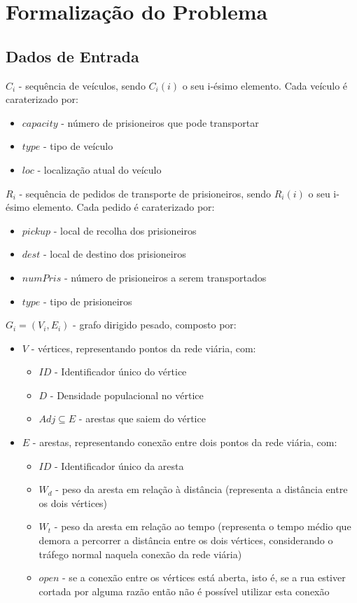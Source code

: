 \documentclass[article, a4paper, 12pt, oneside]{memoir}
\begin{document}
\chapter[Formalização do Problema][Formalização do Problema]{Formalização do Problema} \label{\thechapter}

\section{Dados de Entrada}

$C_i$ - sequência de veículos, sendo $C_i(i)$ o seu i-ésimo elemento. Cada veículo é caraterizado por:
\begin{itemize}
	\item $capacity$ - número de prisioneiros que pode transportar
	\item $type$ - tipo de veículo
	\item $loc$ - localização atual do veículo
\end{itemize}

$R_i$ - sequência de pedidos de transporte de prisioneiros, sendo $R_i(i)$ o seu i-ésimo elemento. Cada pedido é caraterizado por:
\begin{itemize}
	\item $pickup$ - local de recolha dos prisioneiros
	\item $dest$ - local de destino dos prisioneiros
	\item $numPris$ - número de prisioneiros a serem transportados
	\item $type$ - tipo de prisioneiros
\end{itemize}

$G_i = (V_i, E_i)$ - grafo dirigido pesado, composto por:
\begin{itemize}
	\item $V$ - vértices, representando pontos da rede viária, com:
		\begin{itemize}
			\item $ID$ - Identificador único do vértice
			\item $D$ - Densidade populacional no vértice
			\item $Adj \subseteq E$ - arestas que saiem do vértice
		\end{itemize}
	\item $E$ - arestas, representando conexão entre dois pontos da rede viária, com:
		\begin{itemize}
			\item $ID$ - Identificador único da aresta
			\item $W_d$ - peso da aresta em relação à distância (representa a distância entre os dois vértices)
			\item $W_t$ - peso da aresta em relação ao tempo (representa o tempo médio que demora a percorrer a distância entre os dois vértices, considerando o tráfego normal naquela conexão da rede viária)
			\item $open$ - se a conexão entre os vértices está aberta, isto é, se a rua estiver cortada por alguma razão então não é possível utilizar esta conexão
		\end{itemize}
\end{itemize}
\end{document}

